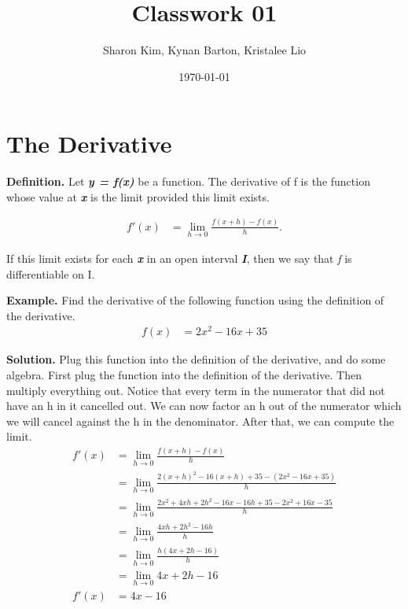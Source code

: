 \documentclass[aps,pra,notitlepage,amsmath,amssymb,letterpaper,12pt]{revtex4-1}
\begin{document}
 
\title{Classwork 01}
\author{Sharon Kim, Kynan Barton, Kristalee Lio}
\date{\today}

\maketitle

\section{The Derivative}

\noindent \textbf{Definition.}
Let \textbf{\textit{y = f(x)}} be a function. The derivative of f is the function whose value at \textbf{\textit{x}} is the limit provided this limit exists.

\begin{align*}
f'(x) &= \lim_{h \to 0} \frac{f(x+h)-f(x)}{h}.
\end{align*}

\noindent If this limit exists for each \textbf{\textit{x}} in an open interval \textbf{\textit{I}}, then we say that \textit{f} is differentiable on I.

\bigskip
\noindent \textbf{Example.}
Find the derivative of the following function using the definition of the derivative.
\begin{align*}
f(x) &= 2x^2-16x+35
\end{align*}

\noindent \textbf{Solution.}
Plug this function into the definition of the derivative, and do some algebra. First plug the function into the definition of the derivative. Then multiply everything out. Notice that every term in the numerator that did not have an h in it cancelled out. We can now factor an h out of the numerator which we will cancel against the h in the denominator. After that, we can compute the limit.
\begin{align*}
f'(x) &= \lim_{h \to 0} \frac{f(x+h)-f(x)}{h} \\
&= \lim_{h \to 0} \frac{2(x+h)^2 -16(x+h) +35 -(2x^2-16x+35)}{h} \\
&= \lim_{h \to 0} \frac{2x^2 +4xh +2h^2 -16x -16h +35 -2x^2+16x-35}{h}\\
&= \lim_{h \to 0} \frac{4xh +2h^2 -16h}{h} \\
&= \lim_{h \to 0} \frac{h(4x+2h-16)}{h} \\
&= \lim_{h \to 0} 4x+2h-16 \\
f'(x) &= 4x-16
\end{align*}
\end{document}
